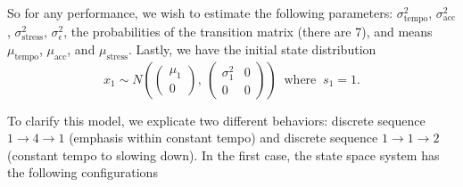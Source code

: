 \documentclass[aoas]{imsart}
\begin{document}
So for any performance, we wish to estimate
the following parameters: $\sigma_{\textrm{tempo}}^2$, $\sigma_{\textrm{acc}}^2$, $\sigma^2_{\textrm{stress}}$,
$\sigma_\epsilon^2$, the probabilities of the transition matrix (there
are 7), and means $\mu_{\textrm{tempo}}$, $\mu_{\textrm{acc}}$, and $\mu_{\textrm{stress}}$. Lastly, we have the initial state distribution
\[
x_1\sim N\left( \begin{pmatrix}\mu_1\\0\end{pmatrix}
  ,\ \begin{pmatrix} \sigma^2_1 & 0\\0 & 0
  \end{pmatrix}\right)\; \; \textrm{where} \; \; s_1=1.
\]

To clarify this model, we explicate two different behaviors: discrete
sequence $1\rightarrow 4\rightarrow 1$ (emphasis within constant tempo) and discrete sequence
$1\rightarrow 1\rightarrow 2$ (constant tempo to slowing down). In the
first case, the state space system has the following configurations
\end{document}
